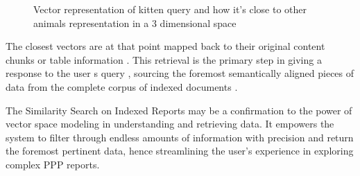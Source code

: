 \begin{enumerate}
\begin{figure}[H]
        \caption{Vector representation of kitten query and how it's close to other animals representation in a 3 dimensional space}
        \label{fig:vec_search}
    \end{figure}
    \vskip 0.5cm
    The closest vectors are at that point mapped back to their original content chunks or table information . This retrieval is the primary step in giving a response to the user s query , sourcing the foremost semantically aligned pieces of data from the complete corpus of indexed documents .
\end{enumerate}
The Similarity Search on Indexed Reports may be a confirmation to the power of vector space modeling in understanding and retrieving data. It empowers the system to filter through endless amounts of information with precision and return the foremost pertinent data, hence streamlining the user's experience in exploring complex PPP reports.
